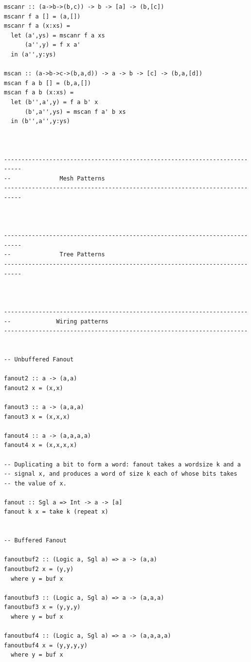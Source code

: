 \documentclass[]{svmono}
\begin{document}
\begin{verbatim}
mscanr :: (a->b->(b,c)) -> b -> [a] -> (b,[c])
mscanr f a [] = (a,[])
mscanr f a (x:xs) =
  let (a',ys) = mscanr f a xs
      (a'',y) = f x a'
  in (a'',y:ys)

mscan :: (a->b->c->(b,a,d)) -> a -> b -> [c] -> (b,a,[d])
mscan f a b [] = (b,a,[])
mscan f a b (x:xs) =
  let (b'',a',y) = f a b' x
      (b',a'',ys) = mscan f a' b xs
  in (b'',a'',y:ys)



---------------------------------------------------------------------------
--			    Mesh Patterns
---------------------------------------------------------------------------



---------------------------------------------------------------------------
--			    Tree Patterns
---------------------------------------------------------------------------



----------------------------------------------------------------------
--			   Wiring patterns
----------------------------------------------------------------------


-- Unbuffered Fanout

fanout2 :: a -> (a,a)
fanout2 x = (x,x)

fanout3 :: a -> (a,a,a)
fanout3 x = (x,x,x)

fanout4 :: a -> (a,a,a,a)
fanout4 x = (x,x,x,x)

-- Duplicating a bit to form a word: fanout takes a wordsize k and a
-- signal x, and produces a word of size k each of whose bits takes
-- the value of x.

fanout :: Sgl a => Int -> a -> [a]
fanout k x = take k (repeat x)


-- Buffered Fanout

fanoutbuf2 :: (Logic a, Sgl a) => a -> (a,a)
fanoutbuf2 x = (y,y)
  where y = buf x

fanoutbuf3 :: (Logic a, Sgl a) => a -> (a,a,a)
fanoutbuf3 x = (y,y,y)
  where y = buf x

fanoutbuf4 :: (Logic a, Sgl a) => a -> (a,a,a,a)
fanoutbuf4 x = (y,y,y,y)
  where y = buf x
\end{verbatim}
\end{document}
